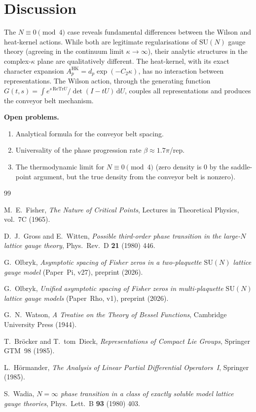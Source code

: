 \documentclass[12pt]{article}
\theoremstyle{definition}
\theoremstyle{remark}
\newcommand{\SU}{\mathrm{SU}}
\newcommand{\Tr}{\mathrm{Tr}}
\newcommand{\dU}{\,\mathrm{d}U}
\begin{document}
\section{Discussion}

The $N \equiv 0\!\pmod{4}$ case reveals fundamental differences between
the Wilson and heat-kernel actions. While both are legitimate regularisations
of $\SU(N)$ gauge theory (agreeing in the continuum limit $\kappa \to \infty$),
their analytic structures in the complex-$\kappa$ plane are qualitatively
different. The heat-kernel, with its exact character expansion
$A_p^{\mathrm{HK}} = d_p \exp(-C_2 \kappa)$, has no interaction between
representations. The Wilson action, through the generating function
$G(t,s) = \int e^{s\,\mathrm{Re}\Tr U} / \det(I - tU)\dU$, couples all
representations and produces the conveyor belt mechanism.

\medskip\noindent
\textbf{Open problems.}
\begin{enumerate}
  \item Analytical formula for the conveyor belt spacing.
  \item Universality of the phase progression rate $\beta \approx 1.7\pi$/rep.
  \item The thermodynamic limit for $N \equiv 0\!\pmod{4}$ (zero density
  is $0$ by the saddle-point argument, but the true density from the
  conveyor belt is nonzero).
\end{enumerate}


\begin{thebibliography}{99}

M.~E.~Fisher, \emph{The Nature of Critical Points},
Lectures in Theoretical Physics, vol.~7C (1965).

D.~J.~Gross and E.~Witten,
\emph{Possible third-order phase transition in the large-$N$ lattice
gauge theory}, Phys.\ Rev.\ D \textbf{21} (1980) 446.

G.~Olbryk, \emph{Asymptotic spacing of Fisher zeros in a two-plaquette
$\SU(N)$ lattice gauge model} (Paper~Pi, v27), preprint (2026).

G.~Olbryk, \emph{Unified asymptotic spacing of Fisher zeros in
multi-plaquette $\SU(N)$ lattice gauge models} (Paper~Rho, v1),
preprint (2026).

G.~N.~Watson, \emph{A Treatise on the Theory of Bessel Functions},
Cambridge University Press (1944).

T.~Br\"ocker and T.~tom~Dieck, \emph{Representations of Compact Lie
Groups}, Springer GTM~98 (1985).

L.~H\"ormander, \emph{The Analysis of Linear Partial Differential
Operators~I}, Springer (1985).

S.~Wadia, \emph{$N = \infty$ phase transition in a class of exactly
soluble model lattice gauge theories}, Phys.\ Lett.\ B \textbf{93} (1980) 403.

\end{thebibliography}
\end{document}
